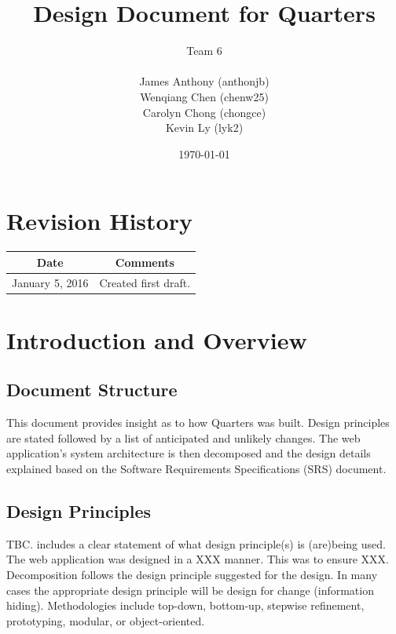 \documentclass[12pt]{article}
\begin{document}
\title{Design Document for Quarters}
\author{Team 6\\ \\James Anthony (anthonjb)\\ Wenqiang Chen (chenw25)\\ Carolyn Chong
(chongce)\\ Kevin Ly (lyk2)}
\date{\today}

\maketitle

\pagebreak

\tableofcontents 
\listoffigures

\section*{Revision History}
\begin{tabular}{|c|c|}
\hline
\textbf{Date}  & \textbf{Comments} \\ \hline
January 5, 2016 & Created first draft. \\
\hline
\end{tabular}

\pagebreak


\section{Introduction and Overview}

\subsection{Document Structure}
This document provides insight as to how Quarters was built. Design principles are stated followed by a list of anticipated and unlikely changes. The web application's system architecture is then decomposed and the design details explained based on the Software Requirements Specifications (SRS) document.

\subsection{Design Principles}
TBC. includes a clear statement of what design principle(s) is (are)being used. The web application was designed in a XXX manner. This was to ensure XXX. Decomposition follows the design principle suggested for the design. In many cases the appropriate design principle will be design for change (information hiding). Methodologies include top-down, bottom-up, stepwise refinement, prototyping, modular, or object-oriented.
\end{document}
